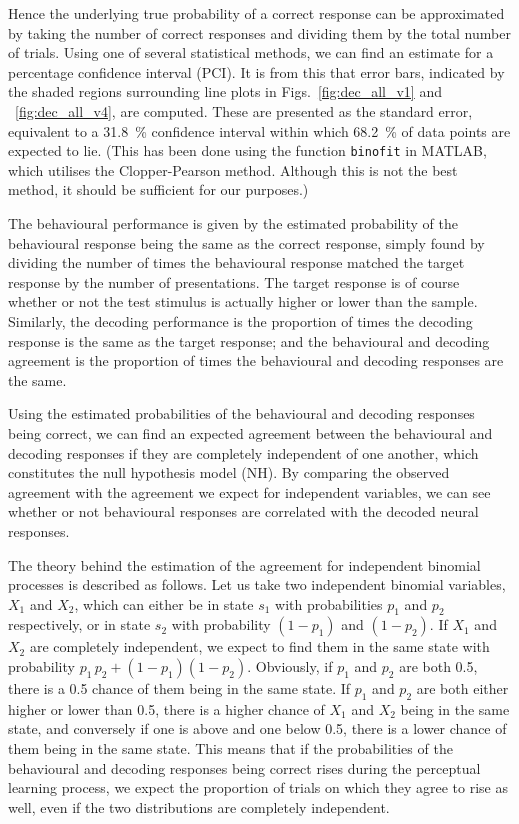 Hence the underlying true probability of a correct response can be approximated by taking the number of correct responses and dividing them by the total number of trials.
Using one of several statistical methods, we can find an estimate for a percentage confidence interval (PCI).
It is from this that error bars, indicated by the shaded regions surrounding line plots in Figs.~\ref{fig:dec_all_v1} and ~\ref{fig:dec_all_v4}, are computed.
These are presented as the standard error, equivalent to a \SI{31.8}{\percent}  confidence interval within which \SI{68.2}{\percent} of data points are expected to lie.
(This has been done using the function \texttt{binofit} in MATLAB, which utilises the Clopper-Pearson method.
Although this is not the best method, it should be sufficient for our purposes.)

The behavioural performance is given by the estimated probability of the behavioural response being the same as the correct response, simply found by dividing the number of times the behavioural response matched the target response by the number of presentations.
The target response is of course whether or not the test stimulus is actually higher or lower than the sample.
Similarly, the decoding performance is the proportion of times the decoding response is the same as the target response; and the behavioural and decoding agreement is the proportion of times the behavioural and decoding responses are the same.

Using the estimated probabilities of the behavioural and decoding responses being correct, we can find an expected agreement between the behavioural and decoding responses if they are completely independent of one another, which constitutes the null hypothesis model (NH).
By comparing the observed agreement with the agreement we expect for independent variables, we can see whether or not behavioural responses are correlated with the decoded neural responses.

The theory behind the estimation of the agreement for independent binomial processes is described as follows.
Let us take two independent binomial variables, $X_1$ and $X_2$, which can either be in state $s_1$ with probabilities $p_1$ and $p_2$ respectively, or in state $s_2$ with probability $(1-p_1)$ and $(1-p_2)$.
If $X_1$ and $X_2$ are completely independent, we expect to find them in the same state with probability $p_1 \, p_2 + (1-p_1) (1-p_2)$.
Obviously, if $p_1$ and $p_2$ are both 0.5, there is a 0.5 chance of them being in the same state.
If $p_1$ and $p_2$ are both either higher or lower than 0.5, there is a higher chance of $X_1$ and $X_2$ being in the same state, and conversely if one is above and one below 0.5, there is a lower chance of them being in the same state.
This means that if the probabilities of the behavioural and decoding responses being correct rises during the perceptual learning process, we expect the proportion of trials on which they agree to rise as well, even if the two distributions are completely independent.

